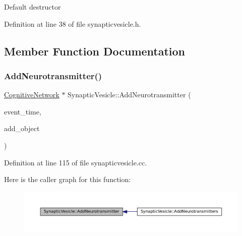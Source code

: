 Default destructor 

Definition at line 38 of file synapticvesicle.\+h.



\subsection{Member Function Documentation}
\mbox{\label{class_synaptic_vesicle_a56d406fdd01f267d868caedb390080ff}} 
\subsubsection{\texorpdfstring{Add\+Neurotransmitter()}{AddNeurotransmitter()}}
{\footnotesize\ttfamily \mbox{\hyperlink{class_cognitive_network}{Cognitive\+Network}} $\ast$ Synaptic\+Vesicle\+::\+Add\+Neurotransmitter (\begin{DoxyParamCaption}\item[{std\+::chrono\+::time\+\_\+point$<$ \mbox{\hyperlink{universe_8h_a0ef8d951d1ca5ab3cfaf7ab4c7a6fd80}{Clock}} $>$}]{event\+\_\+time,  }\item[{\mbox{\hyperlink{class_cognitive_network}{Cognitive\+Network}} $\ast$}]{add\+\_\+object }\end{DoxyParamCaption})}



Definition at line 115 of file synapticvesicle.\+cc.

Here is the caller graph for this function\+:\nopagebreak
\begin{figure}[H]
\begin{center}
\leavevmode
\includegraphics[width=350pt]{class_synaptic_vesicle_a56d406fdd01f267d868caedb390080ff_icgraph}
\end{center}
\end{figure}
\mbox{\label{class_synaptic_vesicle_ac924e6b7b824066a89136e52f2d5ce80}} 
